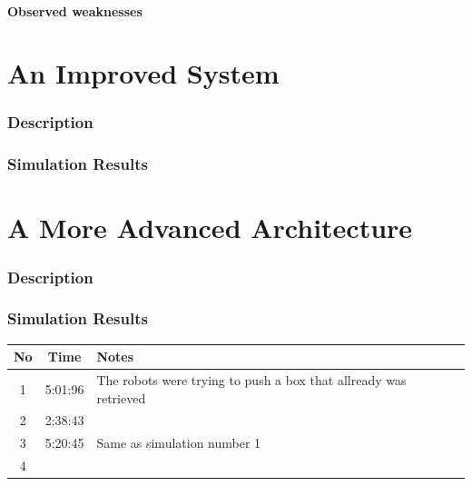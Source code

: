\documentclass[a4paper]{article}
\begin{document}
\subsection{Observed weaknesses}
\part{An Improved System}

\section{Description}



\section{Simulation Results}
\part{A More Advanced Architecture}

\section{Description}
\newpage
\section{Simulation Results}
\begin{table}[H]
\centering
\begin{tabular}{ c | c | p{5cm}}
\hline No & Time & Notes \\ \hline

1 & 5:01:96 & The robots were trying to push a box that allready was retrieved \\ \hline
2 & 2:38:43 & \\ \hline
3 & 5:20:45 & Same as simulation number 1 \\ \hline
4


\end{tabular}
\end{table}




\newpage
\end{document}
